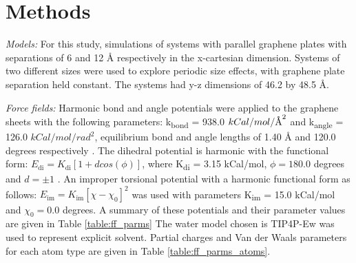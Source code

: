 \documentclass[12pt]{article}
\newcommand{\angstrom}{\textup{\AA}}
\begin{document}
\clearpage

\section*{Methods}

\textit{Models:} For this study, simulations of systems with parallel graphene plates with
separations of 6 and 12 \r A respectively in the x-cartesian dimension.
Systems of two different sizes were used to explore periodic size effects, with graphene
plate separation held constant. The systems had y-z dimensions of 46.2 by 48.5 \r A.

\textit{Force fields:} Harmonic bond and angle potentials were applied to the graphene sheets with 
the following parameters: k\textsubscript{bond} = 938.0 \(kCal/mol/\angstrom^2\)
and k\textsubscript{angle} = 126.0 \(kCal/mol/rad^2\), equilibrium bond and 
angle lengths of 1.40 \r A and 120.0 degrees respectively \cite{Hummer2001}. The
dihedral potential is harmonic with the functional form: \(E_{\text{di}} = K_{\text{di}} [ 1 + d cos(\phi)]\),
where K\textsubscript{di} = 3.15 kCal/mol, \(\phi = 180.0\) degrees and \(d = \pm 1\) \cite{Patra2009}. An improper torsional 
potential with a harmonic functional form as follows: \( E_{\text{im}} = K_{\text{im}} [ \chi - \chi_0 ]^2\) was
used with parameters K\textsubscript{im} =  15.0 kCal/mol and \(\chi_0 = 0.0\) degrees. A summary
of these potentials and their parameter values are given in Table \ref{table:ff_parms}
The water model chosen is TIP4P-Ew \cite{Horn2004} was used 
to represent explicit solvent. Partial charges and Van der Waals parameters for each atom type 
are given in Table \ref{table:ff_parms_atoms}.
\end{document}
